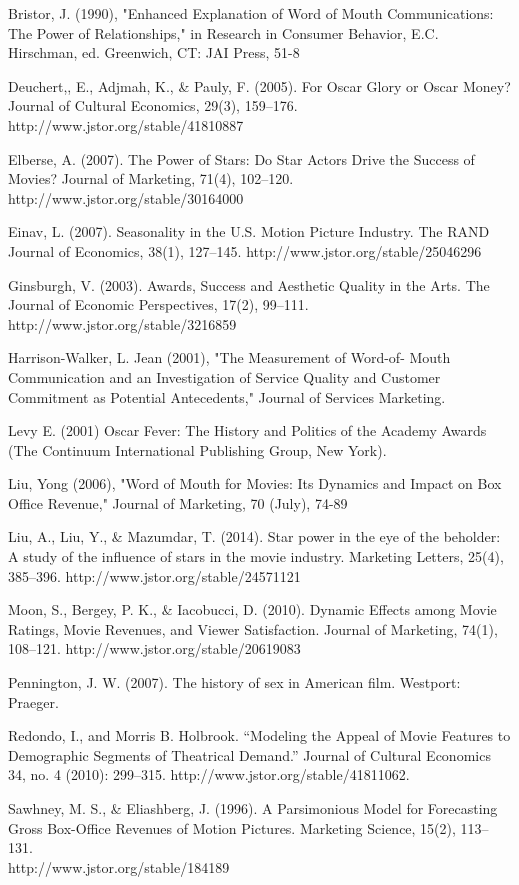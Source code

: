 \documentclass[10.7pt]{article} %
\begin{document}
\noindent 
 
 Bristor, J. (1990), "Enhanced Explanation of Word of Mouth Communications: The Power of Relationships," in Research in Consumer Behavior, E.C. Hirschman, ed. Greenwich, CT: JAI Press, 51-8

Deuchert,, E., Adjmah, K., & Pauly, F. (2005). For Oscar Glory or Oscar Money? Journal of Cultural Economics, 29(3), 159–176. http://www.jstor.org/stable/41810887 

Elberse, A. (2007). The Power of Stars: Do Star Actors Drive the Success of Movies? Journal of Marketing, 71(4), 102–120. http://www.jstor.org/stable/30164000 

Einav, L. (2007). Seasonality in the U.S. Motion Picture Industry. The RAND Journal of Economics, 38(1), 127–145. http://www.jstor.org/stable/25046296 
 
Ginsburgh, V. (2003). Awards, Success and Aesthetic Quality in the Arts. The Journal of Economic Perspectives, 17(2), 99–111. http://www.jstor.org/stable/3216859 

Harrison-Walker, L. Jean (2001), "The Measurement of Word-of- Mouth Communication and an Investigation of Service Quality and Customer Commitment as Potential Antecedents," Journal of Services Marketing. 

Levy E. (2001) Oscar Fever: The History and Politics of the Academy Awards (The Continuum International Publishing Group, New York). 

Liu, Yong (2006), "Word of Mouth for Movies: Its Dynamics and Impact on Box Office Revenue," Journal of Marketing, 70 (July), 74-89

Liu, A., Liu, Y., & Mazumdar, T. (2014). Star power in the eye of the beholder: A study of the influence of stars in the movie industry. Marketing Letters, 25(4), 385–396. http://www.jstor.org/stable/24571121

Moon, S., Bergey, P. K., & Iacobucci, D. (2010). Dynamic Effects among Movie Ratings, Movie Revenues, and Viewer Satisfaction. Journal of Marketing, 74(1), 108–121. http://www.jstor.org/stable/20619083 

Pennington, J. W. (2007). The history of sex in American film. Westport: Praeger.


Redondo, I., and Morris B. Holbrook. “Modeling the Appeal of Movie Features to Demographic Segments of Theatrical Demand.” Journal of Cultural Economics 34, no. 4 (2010): 299–315. http://www.jstor.org/stable/41811062.
 
Sawhney, M. S., & Eliashberg, J. (1996). A Parsimonious Model for Forecasting Gross Box-Office Revenues of Motion Pictures. Marketing Science, 15(2), 113–131.\\ http://www.jstor.org/stable/184189
\end{document}
